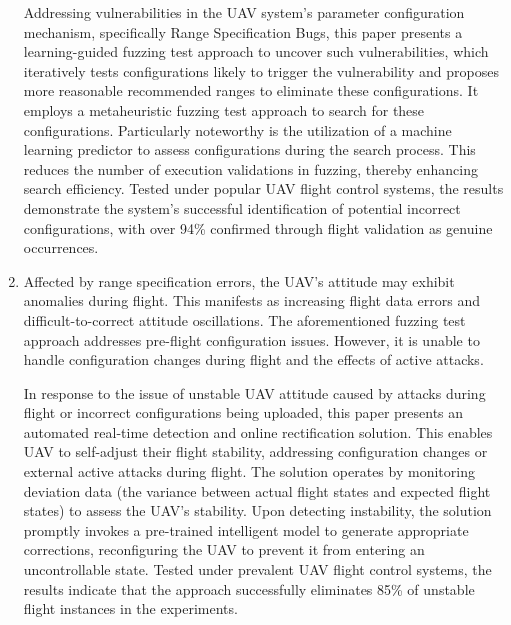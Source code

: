 \begin{enumerate}
    Addressing vulnerabilities in the UAV system's parameter configuration mechanism, specifically Range Specification Bugs, this paper presents a learning-guided fuzzing test approach to uncover such vulnerabilities,  which iteratively tests configurations likely to trigger the vulnerability and proposes more reasonable recommended ranges to eliminate these configurations.
    It employs a metaheuristic fuzzing test approach to search for these configurations. Particularly noteworthy is the utilization of a machine learning predictor to assess configurations during the search process. 
    This reduces the number of execution validations in fuzzing, thereby enhancing search efficiency. 
    Tested under popular UAV flight control systems, the results demonstrate the system's successful identification of potential incorrect configurations, with over 94\% confirmed through flight validation as genuine occurrences.

    \item Affected by range specification errors, the UAV's attitude may exhibit anomalies during flight. 
    This manifests as increasing flight data errors and difficult-to-correct attitude oscillations. The aforementioned fuzzing test approach addresses pre-flight configuration issues. 
    However, it is unable to handle configuration changes during flight and the effects of active attacks.
    
   In response to the issue of unstable UAV attitude caused by attacks during flight or incorrect configurations being uploaded, this paper presents an automated real-time detection and online rectification solution. 
   This enables UAV to self-adjust their flight stability, addressing configuration changes or external active attacks during flight.
    The solution operates by monitoring deviation data (the variance between actual flight states and expected flight states) to assess the UAV's stability. 
    Upon detecting instability, the solution promptly invokes a pre-trained intelligent model to generate appropriate corrections, reconfiguring the UAV to prevent it from entering an uncontrollable state.
    Tested under prevalent UAV flight control systems, the results indicate that the approach successfully eliminates 85\% of unstable flight instances in the experiments.
    
\end{enumerate}


